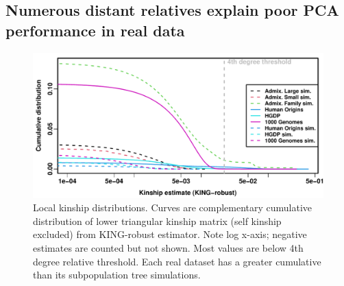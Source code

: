 \documentclass[9pt,lineno]{elife}
\begin{document}
\subsection{Numerous distant relatives explain poor PCA performance in real data}

\begin{figure}
  \includegraphics[width=\textwidth]{king_log-x.pdf}
  \caption{
    Local kinship distributions.
    Curves are complementary cumulative distribution of lower triangular kinship matrix (self kinship excluded) from KING-robust estimator.
    Note log x-axis; negative estimates are counted but not shown.
    Most values are below 4th degree relative threshold.
    Each real dataset has a greater cumulative than its subpopulation tree simulations.
  }
  \label{fig:king}

\end{figure}
\end{document}
